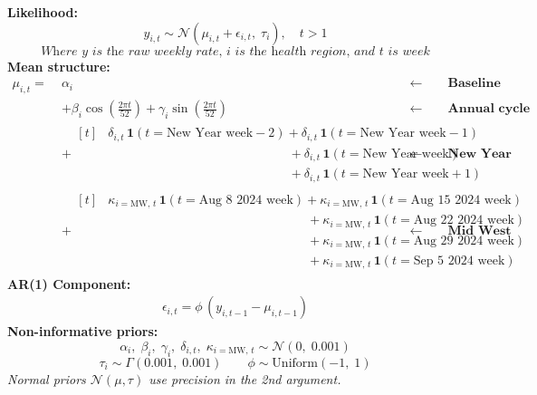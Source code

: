 \documentclass[varwidth=24cm,border=14pt]{standalone}
\begin{document}
\begin{minipage}{24cm}

\textbf{Likelihood:}
\[
y_{i,t} \sim \mathcal{N}\!\left(\mu_{i,t} + \epsilon_{i,t},\; \tau_i\right), \quad t > 1
\]
\[
\textit{Where y is the raw weekly rate, i is the health region, and t is week}
\]  
\bigskip
\textbf{Mean structure:}
\begin{align*}
\mu_{i,t} =\;& \alpha_i 
   && \leftarrow \qquad \textbf{Baseline} \\
&+ \beta_i \cos\!\left(\tfrac{2\pi t}{52}\right) + \gamma_i \sin\!\left(\tfrac{2\pi t}{52}\right)
   && \leftarrow \qquad \textbf{Annual cycle} \\
&+ \begin{aligned}[t]
     & \delta_{i,t}\,\mathbf{1}(t = \text{New Year week}-2) + \delta_{i,t}\,\mathbf{1}(t = \text{New Year week}-1) \\
     & \phantom{\delta_{i,t}\,\mathbf{1}(t = \text{New Year week}-2)\ } + \delta_{i,t}\,\mathbf{1}(t = \text{New Year week}) \\
     & \phantom{\delta_{i,t}\,\mathbf{1}(t = \text{New Year week}-2)\ } + \delta_{i,t}\,\mathbf{1}(t = \text{New Year week}+1)
   \end{aligned}
   && \leftarrow \qquad \textbf{New Year effect} \\
&+ \begin{aligned}[t]
     & \kappa_{i=\text{MW},\,t}\,\mathbf{1}(t = \text{Aug 8 2024 week}) + \kappa_{i=\text{MW},\,t}\,\mathbf{1}(t = \text{Aug 15 2024 week}) \\
     & \phantom{\kappa_{i=\text{MW},\,t}\,\mathbf{1}(t = \text{Aug 8 2024 week})\ } + \kappa_{i=\text{MW},\,t}\,\mathbf{1}(t = \text{Aug 22 2024 week}) \\
     & \phantom{\kappa_{i=\text{MW},\,t}\,\mathbf{1}(t = \text{Aug 8 2024 week})\ } + \kappa_{i=\text{MW},\,t}\,\mathbf{1}(t = \text{Aug 29 2024 week}) \\
     & \phantom{\kappa_{i=\text{MW},\,t}\,\mathbf{1}(t = \text{Aug 8 2024 week})\ } + \kappa_{i=\text{MW},\,t}\,\mathbf{1}(t = \text{Sep 5 2024 week})
   \end{aligned}
   && \leftarrow \qquad \textbf{Mid West reset}
\end{align*}
\bigskip
\textbf{AR(1) Component:}
\begin{align*}
\epsilon_{i,t} = \phi\,(y_{i,t-1} - \mu_{i,t-1})
\end{align*}
\bigskip
\textbf{Non-informative priors:}
\[
\alpha_i,\; \beta_i,\; \gamma_i,\; \delta_{i,t},\; \kappa_{i=\text{MW},\,t} \sim \mathcal{N}(0,\; 0.001)
\]
\[
\tau_i \sim \Gamma(0.001,\; 0.001) \qquad \phi \sim \mathrm{Uniform}(-1,\; 1)
\]
{\footnotesize\itshape Normal priors $\mathcal{N}(\mu,\tau)$ use precision in the 2nd argument.}\\

\end{minipage}
\end{document}
